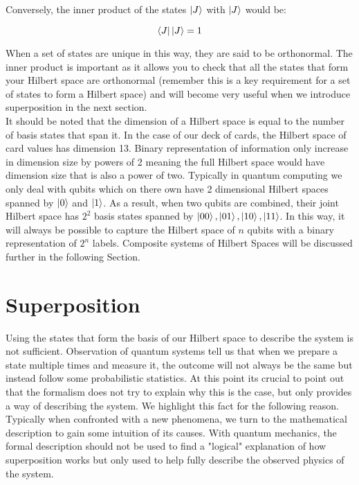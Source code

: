 Conversely, the inner product of the states $\left\vert{J}\right\rangle$ with $\left\vert{J}\right\rangle$ would be:

\begin{equation}
\left\langle{J}\right\vert\left\vert{J}\right\rangle = 1
\end{equation}

When a set of states are unique in this way, they are said to be orthonormal. The inner product is important as it allows you to check that all the states that form your Hilbert space are orthonormal (remember this is a key requirement for a set of states to form a Hilbert space) and will become very useful when we introduce superposition in the next section.\\

It should be noted that the dimension of a Hilbert space is equal to the number of basis states that span it. In the case of our deck of cards, the Hilbert space of card values has dimension 13. Binary representation of information only increase in dimension size by powers of 2 meaning the full Hilbert space would have dimension size that is also a power of two. Typically in quantum computing we only deal with qubits which on there own have 2 dimensional Hilbert spaces spanned by $\left\vert{0}\right\rangle$ and $\left\vert{1}\right\rangle$. As a result, when two qubits are combined, their joint Hilbert space has $2^2$ basis states spanned by ${\left\vert{00}\right\rangle, \left\vert{01}\right\rangle, \left\vert{10}\right\rangle, \left\vert{11}\right\rangle}$. In this way, it will always be possible to capture the Hilbert space of $n$ qubits with a binary representation of $2^n$ labels. Composite systems of Hilbert Spaces will be discussed further in the following Section.

\section{Superposition}

Using the states that form the basis of our Hilbert space to describe the system is not sufficient. Observation of quantum systems tell us that when we prepare a state multiple times and measure it, the outcome will not always be the same but instead follow some probabilistic statistics. At this point its crucial to point out that the formalism does not try to explain why this is the case, but only provides a way of describing the system. We highlight this fact for the following reason. Typically when confronted with a new phenomena, we turn to the mathematical description to gain some intuition of its causes. With quantum mechanics, the formal description should not be used to find a "logical" explanation of how superposition works but only used to help fully describe the observed physics of the system.\\

